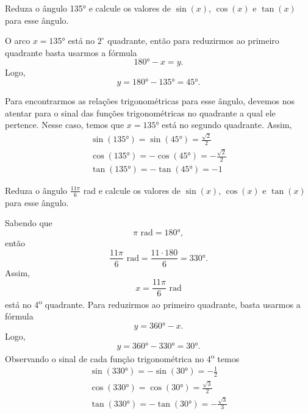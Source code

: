 \begin{example}
  Reduza o ângulo \ang{135}
  e calcule os valores de
  $\sin(x)$, $\cos(x)$ e $\tan(x)$ para esse ângulo.

  \solution
  O arco $x=\ang{135}$ está no $2^{\circ}$ quadrante, então para
  reduzirmos ao primeiro quadrante basta usarmos a fórmula
  \[
    \ang{180} - x = y.
  \]
  Logo,
  \[
    y
    = \ang{180} - \ang{135}
    = \ang{45}.
  \]

  Para encontrarmos as relações trigonométricas para esse ângulo, devemos
  nos atentar para o sinal das funções trigonométricas no quadrante a qual
  ele pertence. Nesse caso, temos que $x=\ang{135}$ está no segundo
  quadrante. Assim,
  \begin{gather*}
    \sin(\ang{135}) =  \sin(\ang{45}) =  \frac{\sqrt{2}}{2} \\[2mm]
    \cos(\ang{135}) = -\cos(\ang{45}) = -\frac{\sqrt{2}}{2} \\[2mm]
    \tan(\ang{135}) = -\tan(\ang{45}) = -1
  \end{gather*}
\end{example}

\begin{example}
  Reduza o ângulo
  \(\frac{11 \pi}{6}\) rad
  e calcule os valores de
  $\sin(x)$, $\cos(x)$ e $\tan(x)$ para esse ângulo.

  \solution
  Sabendo que
  \[
    \pi \text{ rad} = \ang{180},
  \]
  então
  \[
    \frac{11\pi}{6} \text{ rad}
    = \frac{11 \cdot 180}{6}
    = \ang{330}.
  \]
  Assim,
  \[
    x = \frac{11\pi}{6} \text{ rad}
  \]
  está no 4\textsuperscript{o} quadrante.
  Para reduzirmos ao primeiro quadrante, basta
  usarmos a fórmula
  \[
    y =\ang{360} - x.
  \]
  Logo,
  \[
    y
    = \ang{360} - \ang{330}
    = \ang{30}.
  \]
  Observando o sinal de cada função trigonométrica no
  4\textsuperscript{o} temos
  \begin{gather*}
    \sin(\ang{330}) = -\sin(\ang{30}) = -\frac{1}{2}          \\[2mm]
    \cos(\ang{330}) =  \cos(\ang{30}) =  \frac{\sqrt{3}}{2}   \\[2mm]
    \tan(\ang{330}) = -\tan(\ang{30}) = -\frac{\sqrt{3}}{3}
  \end{gather*}
\end{example}

